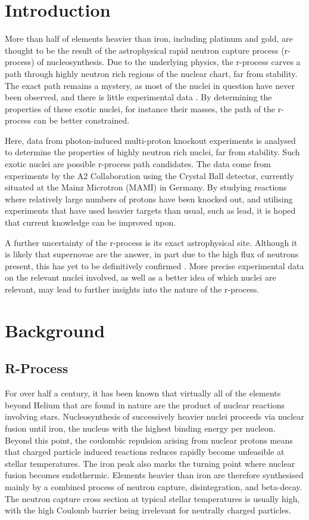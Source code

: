 \documentclass[a4paper,12pt]{article}
\begin{document}
\section{Introduction}
More than half of elements heavier than iron, including platinum and gold, are thought to be the result of the astrophysical rapid neutron capture process (r-process) of nucleosynthesis. Due to the underlying physics, the r-process carves a path through highly neutron rich regions of the nuclear chart, far from stability. The exact path remains a mystery, as most of the nuclei in question have never been observed, and there is little experimental data \cite{cowan}{}. By determining the properties of these exotic nuclei, for instance their masses, the path of the r-process can be better constrained.


Here, data from photon-induced multi-proton knockout experiments is analysed to determine the properties of highly neutron rich nuclei, far from stability. Such exotic nuclei are possible r-process path candidates. The data come from experiments by the A2 Collaboration using the Crystal Ball detector, currently situated at the Mainz Microtron (MAMI) in Germany. By studying reactions where relatively large numbers of protons have been knocked out, and utilising experiments that have used heavier targets than usual, such as lead, it is hoped that current knowledge can be improved upon.  

A further uncertainty of the r-process is its exact astrophysical site. Although it is likely that supernovae are the answer, in part due to the high flux of neutrons present, this has yet to be definitively confirmed \cite{thielemann}{}. More precise experimental data on the relevant nuclei involved, as well as a better idea of which nuclei are relevant, may lead to further insights into the nature of the r-process.


\section{Background}
\subsection{R-Process}
For over half a century, it has been known that virtually all of the elements beyond Helium that are found in nature are the product of nuclear reactions involving stars. Nucleosynthesis of successively heavier nuclei proceeds via nuclear fusion until iron, the nucleus with the highest binding energy per nucleon. Beyond this point, the coulombic repulsion arising from nuclear protons means that charged particle induced reactions reduces rapidly become unfeasible at stellar temperatures\cite{iliadis}{}. The iron peak also marks the turning point where nuclear fusion becomes endothermic. Elements heavier than iron are therefore synthesised mainly by a combined process of neutron capture, disintegration, and beta-decay\cite{b2fh}{}. The neutron capture cross section at typical stellar temperatures is usually high, with the high Coulomb barrier being irrelevant for neutrally charged particles\cite{iliadis}{}. 
\end{document}
